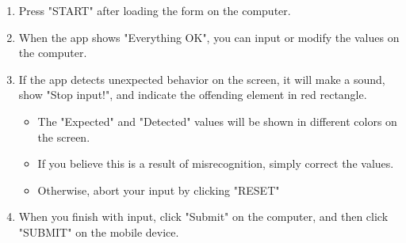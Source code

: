 \documentclass[sigconf, anonymous, balance=false]{acmart}
\begin{document}
{ \ttfamily
\begin{enumerate}
	\item Press "START" after loading the form on the computer.

	\item When the app shows "Everything OK", you can input or modify the values on the computer.

	\item If the app detects unexpected behavior on the screen, it will make a sound, show "Stop input!", and indicate the offending element in red rectangle.
	\begin{itemize}
		\item The "Expected" and "Detected" values will be shown in different colors on the screen.
		\item If you believe this is a result of misrecognition, simply correct the values.
		\item Otherwise, abort your input by clicking "RESET"
	\end{itemize}

	\item When you finish with input, click "Submit" on the computer, and then click "SUBMIT" on the mobile device.
\end{enumerate}
}




\end{document}
